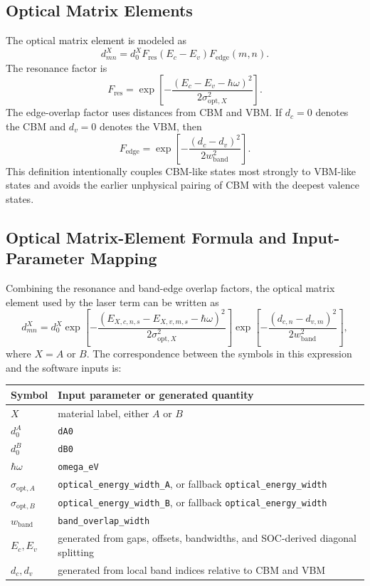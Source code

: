 \documentclass[11pt,a4paper]{article}
\begin{document}
\subsection{Optical Matrix Elements}

The optical matrix element is modeled as
\begin{equation}
d^X_{mn}=d^X_0 F_{\mathrm{res}}(E_c-E_v)F_{\mathrm{edge}}(m,n).
\end{equation}
The resonance factor is
\begin{equation}
F_{\mathrm{res}}=
\exp\left[-\frac{(E_c-E_v-\hbar\omega)^2}{2\sigma_{\mathrm{opt},X}^2}\right].
\end{equation}
The edge-overlap factor uses distances from CBM and VBM.  If $d_c=0$ denotes the CBM and $d_v=0$ denotes the VBM, then
\begin{equation}
F_{\mathrm{edge}}
=
\exp\left[-\frac{(d_c-d_v)^2}{2w_{\mathrm{band}}^2}\right].
\end{equation}
This definition intentionally couples CBM-like states most strongly to VBM-like states and avoids the earlier unphysical pairing of CBM with the deepest valence states.


\subsection{Optical Matrix-Element Formula and Input-Parameter Mapping}

Combining the resonance and band-edge overlap factors, the optical matrix element used by the laser term can be written as
\begin{equation}
d^X_{mn}
=
d^X_0
\exp\left[
	-\frac{(E_{X,c,n,s}-E_{X,v,m,s}-\hbar\omega)^2}{2\sigma_{\mathrm{opt},X}^2}
\right]
\exp\left[
	-\frac{(d_{c,n}-d_{v,m})^2}{2w_{\mathrm{band}}^2}
\right],
\end{equation}
where $X=A$ or $B$.  The correspondence between the symbols in this expression and the software inputs is:
\begin{center}
\begin{tabular}{ll}
\toprule
Symbol & Input parameter or generated quantity \\
\midrule
$X$ & material label, either $A$ or $B$ \\
$d^A_0$ & \texttt{dA0} \\
$d^B_0$ & \texttt{dB0} \\
$\hbar\omega$ & \texttt{omega\_eV} \\
$\sigma_{\mathrm{opt},A}$ & \texttt{optical\_energy\_width\_A}, or fallback \texttt{optical\_energy\_width} \\
$\sigma_{\mathrm{opt},B}$ & \texttt{optical\_energy\_width\_B}, or fallback \texttt{optical\_energy\_width} \\
$w_{\mathrm{band}}$ & \texttt{band\_overlap\_width} \\
$E_c,E_v$ & generated from gaps, offsets, bandwidths, and SOC-derived diagonal splitting \\
$d_c,d_v$ & generated from local band indices relative to CBM and VBM \\
\bottomrule
\end{tabular}
\end{center}
\end{document}

